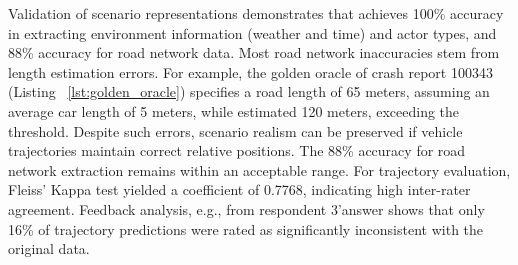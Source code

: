 



Validation of scenario representations demonstrates that {\tool} achieves 100\% accuracy in extracting environment information (weather and time) and actor types, and 88\% accuracy for road network data. Most road network inaccuracies stem from length estimation errors. For example, the golden oracle of crash report 100343 (Listing ~\ref{lst:golden_oracle}) specifies a road length of 65 meters, assuming an average car length of 5 meters, while {\tool} estimated 120 meters, exceeding the threshold. Despite such errors, scenario realism can be preserved if vehicle trajectories maintain correct relative positions. The 88\% accuracy for road network extraction remains within an acceptable range. For trajectory evaluation, Fleiss' Kappa test yielded a coefficient of 0.7768, indicating high inter-rater agreement. Feedback analysis, e.g., from respondent 3'answer shows that only 16\% of trajectory predictions were rated as significantly inconsistent with the original data.



